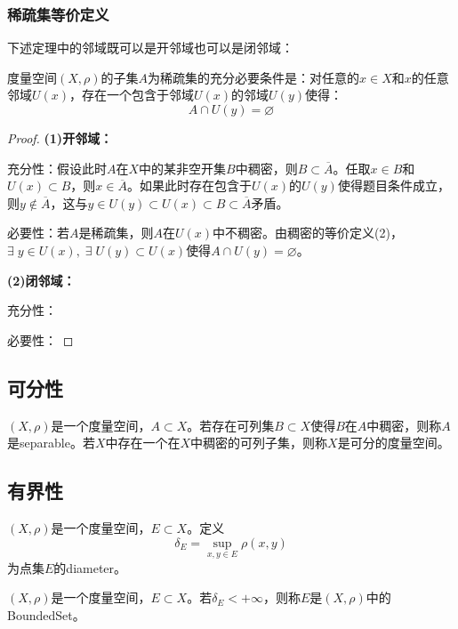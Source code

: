 \subsubsection{稀疏集等价定义}
下述定理中的邻域既可以是开邻域也可以是闭邻域：
\begin{theorem}
	度量空间$(X,\rho)$的子集$A$为稀疏集的充分必要条件是：对任意的$x\in X$和$x$的任意邻域$U(x)$，存在一个包含于邻域$U(x)$的邻域$U(y)$使得：
	\begin{equation*}
		A\cap U(y)=\varnothing
	\end{equation*}
\end{theorem}
\begin{proof}
	\textbf{(1)开邻域：}\par
	充分性：假设此时$A$在$X$中的某非空开集$B$中稠密，则$B\subset\overline{A}$。任取$x\in B$和$U(x)\subset B$，则$x\in\overline{A}$。如果此时存在包含于$U(x)$的$U(y)$使得题目条件成立，则$y\notin\overline{A}$，这与$y\in U(y)\subset U(x)\subset B\subset\overline{A}$矛盾。\par
	必要性：若$A$是稀疏集，则$A$在$U(x)$中不稠密。由稠密的等价定义(2)，$\exists\;y\in U(x),\;\exists\;U(y)\subset U(x)$使得$A\cap U(y)=\varnothing$。\par
	\textbf{(2)闭邻域：}\par
	充分性：\par
	必要性：
\end{proof}
\subsection{可分性}
\begin{definition}
	$(X,\rho)$是一个度量空间，$A\subset X$。若存在可列集$B\subset X$使得$B$在$A$中稠密，则称$A$是\gls{separable}。若$X$中存在一个在$X$中稠密的可列子集，则称$X$是可分的度量空间。
\end{definition}
\subsection{有界性}
\begin{definition}
	$(X,\rho)$是一个度量空间，$E\subset X$。定义
	\begin{equation*}
		\delta_E=\sup_{x,y\in E}\rho(x,y)
	\end{equation*}
	为点集$E$的\gls{diameter}。
\end{definition}
\begin{definition}
	$(X,\rho)$是一个度量空间，$E\subset X$。若$\delta_E<+\infty$，则称$E$是$(X,\rho)$中的\gls{BoundedSet}。
\end{definition}
